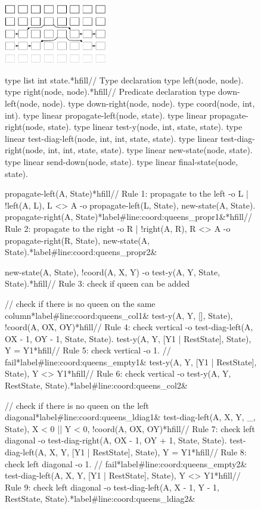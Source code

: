 \begin{figure}[ht!]
\includegraphics[width=0.4\textwidth]{figures/coordination/nqueens.pdf}
\label{coordination:fig:nqueens}
\end{figure}


\begin{figure}[h!]
\begin{LineCode}[fontsize=\scriptsize,commandchars=\*\#\&]
type list int state.*hfill// Type declaration
type left(node, node).  type right(node, node).*hfill// Predicate declaration
type down-left(node, node).  type down-right(node, node).
type coord(node, int, int).
type linear propagate-left(node, state).
type linear propagate-right(node, state).
type linear test-y(node, int, state, state).
type linear test-diag-left(node, int, int, state, state).
type linear test-diag-right(node, int, int, state, state).
type linear new-state(node, state).
type linear send-down(node, state).
type linear final-state(node, state).

propagate-left(A, State)*hfill// Rule 1: propagate to the left
  -o {L | !left(A, L), L <> A -o propagate-left(L, State)}, new-state(A, State).
propagate-right(A, State)*label#line:coord:queens_propr1&*hfill// Rule 2: propagate to the right
  -o {R | !right(A, R), R <> A -o propagate-right(R, State)}, new-state(A, State).*label#line:coord:queens_propr2&

new-state(A, State), !coord(A, X, Y) -o test-y(A, Y, State, State).*hfill// Rule 3: check if queen can be added

// check if there is no queen on the same column*label#line:coord:queens_col1&
test-y(A, Y, [], State), !coord(A, OX, OY)*hfill// Rule 4: check vertical
  -o test-diag-left(A, OX - 1, OY - 1, State, State).
test-y(A, Y, [Y1 | RestState], State), Y = Y1*hfill// Rule 5: check vertical
  -o 1. // fail*label#line:coord:queens_empty1&
test-y(A, Y, [Y1 | RestState], State), Y <> Y1*hfill// Rule 6: check vertical
  -o test-y(A, Y, RestState, State).*label#line:coord:queens_col2&

// check if there is no queen on the left diagonal*label#line:coord:queens_ldiag1&
test-diag-left(A, X, Y, _, State), X < 0 || Y < 0, !coord(A, OX, OY)*hfill// Rule 7: check left diagonal
  -o test-diag-right(A, OX - 1, OY + 1, State, State).
test-diag-left(A, X, Y, [Y1 | RestState], State), Y = Y1*hfill// Rule 8: check left diagonal
  -o 1. // fail*label#line:coord:queens_empty2&
test-diag-left(A, X, Y, [Y1 | RestState], State), Y <> Y1*hfill// Rule 9: check left diagonal
  -o test-diag-left(A, X - 1, Y - 1, RestState, State).*label#line:coord:queens_ldiag2&


\end{LineCode}
\end{figure}
